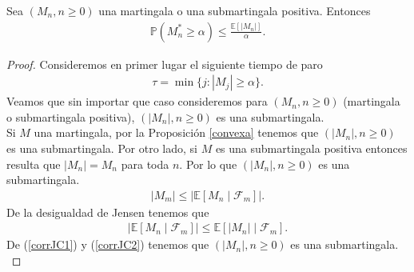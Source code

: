 \begin{theorem} 
\label{primera}
	Sea $(M_n, n \geq 0)$ una martingala o una submartingala positiva. Entonces
	\begin{align*}
		\mathbb{P}(M_n^{*} \geq \alpha) \leq \frac{\mathbb{E}[|M_n|]}{\alpha}.
	\end{align*}
\end{theorem}
\begin{proof}
	Consideremos en primer lugar el siguiente tiempo de paro
	\begin{align*}
		\tau = \min \{j : |M_j| \geq \alpha\}.
	\end{align*}
	Veamos que sin importar que caso consideremos para $(M_n, n \geq 0)$ (martingala o submartingala positiva), $(|M_n|, n \geq 0)$ es una submartingala. \\ 
	
	Si $M$ una martingala, por la Proposición \ref{convexa} tenemos que $(|M_n|, n \geq 0)$ es una submartingala. Por otro lado, si $M$ es una submartingala positiva entonces resulta que $|M_n| = M_n$ para toda $n$. Por lo que $(|M_n|, n \geq 0)$ es una submartingala.
	\begin{align}
	|M_m| \leq  |\mathbb{E}[M_n \mid \mathcal{F}_m]|. \label{corrJC1}
	\end{align}
De la desigualdad de Jensen tenemos que 
	\begin{align}
	|\mathbb{E}[M_n \mid \mathcal{F}_m]| \leq \mathbb{E}[|M_n| \mid \mathcal{F}_m]. \label{corrJC2}
	\end{align}
De (\ref{corrJC1}) y (\ref{corrJC2}) tenemos que $(|M_n|, n \geq 0)$ es una submartingala. \\
	

\end{proof}
